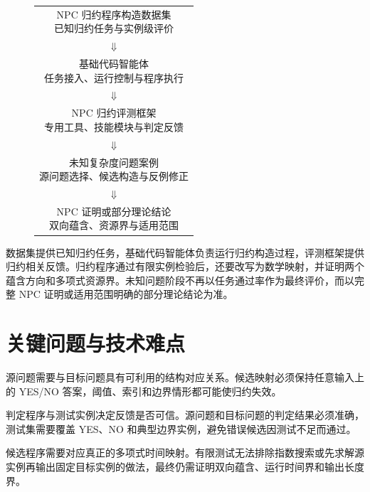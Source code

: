 \begin{figure}[!htbp]
    \centering
    \begin{tabular}{c}
        \fbox{\parbox{0.68\textwidth}{\centering
        NPC 归约程序构造数据集\\
        已知归约任务与实例级评价}}\\[0.35em]
        \(\Downarrow\)\\[0.35em]
        \fbox{\parbox{0.68\textwidth}{\centering
        基础代码智能体\\
        任务接入、运行控制与程序执行}}\\[0.35em]
        \(\Downarrow\)\\[0.35em]
        \fbox{\parbox{0.68\textwidth}{\centering
        NPC 归约评测框架\\
        专用工具、技能模块与判定反馈}}\\[0.35em]
        \(\Downarrow\)\\[0.35em]
        \fbox{\parbox{0.68\textwidth}{\centering
        未知复杂度问题案例\\
        源问题选择、候选构造与反例修正}}\\[0.35em]
        \(\Downarrow\)\\[0.35em]
        \fbox{\parbox{0.68\textwidth}{\centering
        NPC 证明或部分理论结论\\
        双向蕴含、资源界与适用范围}}
    \end{tabular}
    \label{fig:research-route}
\end{figure}
\FloatBarrier

数据集提供已知归约任务，基础代码智能体负责运行归约构造过程，评测框架提供归约相关反馈。归约程序通过有限实例检验后，还要改写为数学映射，并证明两个蕴含方向和多项式资源界。未知问题阶段不再以任务通过率作为最终评价，而以完整 NPC 证明或适用范围明确的部分理论结论为准。

\section{关键问题与技术难点}

源问题需要与目标问题具有可利用的结构对应关系。候选映射必须保持任意输入上的 YES/NO 答案，阈值、索引和边界情形都可能使归约失效。

判定程序与测试实例决定反馈是否可信。源问题和目标问题的判定结果必须准确，测试集需要覆盖 YES、NO 和典型边界实例，避免错误候选因测试不足而通过。

候选程序需要对应真正的多项式时间映射。有限测试无法排除指数搜索或先求解源实例再输出固定目标实例的做法，最终仍需证明双向蕴含、运行时间界和输出长度界。

